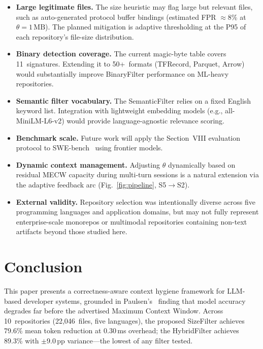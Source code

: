 \documentclass[conference]{IEEEtran}
\begin{document}
\begin{itemize}
  \item[\textbf{L1.}] \textbf{Large legitimate files.}
    The size heuristic may flag large but relevant files, such as
    auto-generated protocol buffer bindings (estimated FPR
    $\approx$8\% at $\theta{=}1\,\text{MB}$). The planned mitigation
    is adaptive thresholding at the P95 of each repository's
    file-size distribution.
  \item[\textbf{L2.}] \textbf{Binary detection coverage.}
    The current magic-byte table covers 11~signatures. Extending it
    to 50+~formats (TFRecord, Parquet, Arrow) would substantially
    improve BinaryFilter performance on ML-heavy repositories.
  \item[\textbf{L3.}] \textbf{Semantic filter vocabulary.}
    The SemanticFilter relies on a fixed English keyword list.
    Integration with lightweight embedding models (e.g.,
    all-MiniLM-L6-v2) would provide language-agnostic relevance
    scoring.
  \item[\textbf{L4.}] \textbf{Benchmark scale.}
    Future work will apply the Section~VIII evaluation protocol to
    SWE-bench~\cite{swebench} using frontier models.
  \item[\textbf{L5.}] \textbf{Dynamic context management.}
    Adjusting $\theta$ dynamically based on residual MECW capacity
    during multi-turn sessions is a natural extension via the adaptive
    feedback arc (Fig.~\ref{fig:pipeline}, S5$\to$S2).
  \item[\textbf{L6.}] \textbf{External validity.}
    Repository selection was intentionally diverse across five
    programming languages and application domains, but may not fully
    represent enterprise-scale monorepos or multimodal repositories
    containing non-text artifacts beyond those studied here.
\end{itemize}

\section{Conclusion}

This paper presents a correctness-aware context hygiene framework for
LLM-based developer systems, grounded in Paulsen's~\cite{paulsen2025}
finding that model accuracy degrades far before the advertised Maximum
Context Window. Across 10~repositories (22,046~files, five languages),
the proposed SizeFilter achieves 79.6\% mean token reduction at
0.30\,ms overhead; the HybridFilter achieves 89.3\% with $\pm$9.0\,pp
variance---the lowest of any filter tested.
\end{document}
